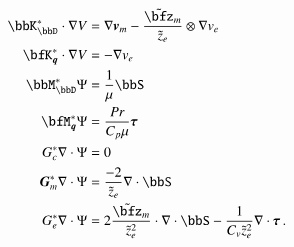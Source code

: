 \documentclass[preprint,12pt]{elsarticle}
\begin{document}
\begin{align*}
\bbK^*_\bbD\cdot\Grad V&=\Grad\bfv_m-\frac{\tilde\bfz_m}{\tilde z_e}\otimes\Grad v_e\\
\bfK^*_{\bfq}\cdot\Grad V&=-\Grad v_e\\
%
\bbM^*_\bbD\Psi&=\frac{1}{\mu}\bbS\\
\bfM^*_{\bfq}\Psi&=\frac{Pr}{C_p\mu}\bftau\\
%
G^*_c\Div\Psi&=0\\
\bfG^*_m\Div\Psi&=\frac{-2}{\tilde z_e}\Div\bbS\\
G^*_e\Div\Psi&=2\frac{\tilde\bfz_m}{\tilde z_e^2}\cdot\Div\bbS-\frac{1}{C_v\tilde z_e^2}\Div\bftau\,.
\end{align*}

 






\end{document}
